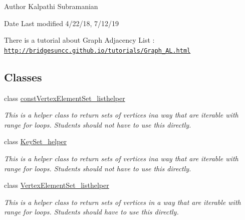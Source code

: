 \begin{DoxyAuthor}{Author}
Kalpathi Subramanian 
\end{DoxyAuthor}
\begin{DoxyDate}{Date}
Last modified 4/22/18, 7/12/19
\end{DoxyDate}
There is a tutorial about Graph Adjacency List \+: \href{http://bridgesuncc.github.io/tutorials/Graph_AL.html}{\tt http\+://bridgesuncc.\+github.\+io/tutorials/\+Graph\+\_\+\+A\+L.\+html} \subsection*{Classes}
\begin{DoxyCompactItemize}
\item 
class \hyperlink{classbridges_1_1datastructure_1_1_graph_adj_list_1_1const_vertex_element_set__listhelper}{const\+Vertex\+Element\+Set\+\_\+listhelper}
\begin{DoxyCompactList}\small\item\em This is a helper class to return sets of vertices ina way that are iterable with range for loops. Students should not have to use this directly. \end{DoxyCompactList}\item 
class \hyperlink{classbridges_1_1datastructure_1_1_graph_adj_list_1_1_key_set__helper}{Key\+Set\+\_\+helper}
\begin{DoxyCompactList}\small\item\em This is a helper class to return sets of vertices ina way that are iterable with range for loops. Students should not have to use this directly. \end{DoxyCompactList}\item 
class \hyperlink{classbridges_1_1datastructure_1_1_graph_adj_list_1_1_vertex_element_set__listhelper}{Vertex\+Element\+Set\+\_\+listhelper}
\begin{DoxyCompactList}\small\item\em This is a helper class to return sets of vertices in a way that are iterable with range for loops. Students should have to use this directly. \end{DoxyCompactList}\end{DoxyCompactItemize}
